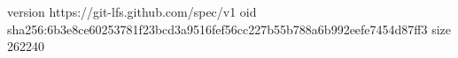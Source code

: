 version https://git-lfs.github.com/spec/v1
oid sha256:6b3e8ce60253781f23bcd3a9516fef56cc227b55b788a6b992eefe7454d87ff3
size 262240
